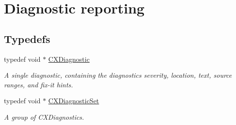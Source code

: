 \hypertarget{group__CINDEX__DIAG}{}\section{Diagnostic reporting}
\label{group__CINDEX__DIAG}
\subsection*{Typedefs}
\begin{DoxyCompactItemize}
\item 
\mbox{\label{group__CINDEX__DIAG_ga44bb8aba7c40590ad25d1763c4fbff7f}} 
typedef void $\ast$ \mbox{\hyperlink{group__CINDEX__DIAG_ga44bb8aba7c40590ad25d1763c4fbff7f}{C\+X\+Diagnostic}}
\begin{DoxyCompactList}\small\item\em A single diagnostic, containing the diagnostic\textquotesingle{}s severity, location, text, source ranges, and fix-\/it hints. \end{DoxyCompactList}\item 
\mbox{\label{group__CINDEX__DIAG_ga38dfc0ae45b55bf7fd577eed9148e244}} 
typedef void $\ast$ \mbox{\hyperlink{group__CINDEX__DIAG_ga38dfc0ae45b55bf7fd577eed9148e244}{C\+X\+Diagnostic\+Set}}
\begin{DoxyCompactList}\small\item\em A group of C\+X\+Diagnostics. \end{DoxyCompactList}\end{DoxyCompactItemize}
